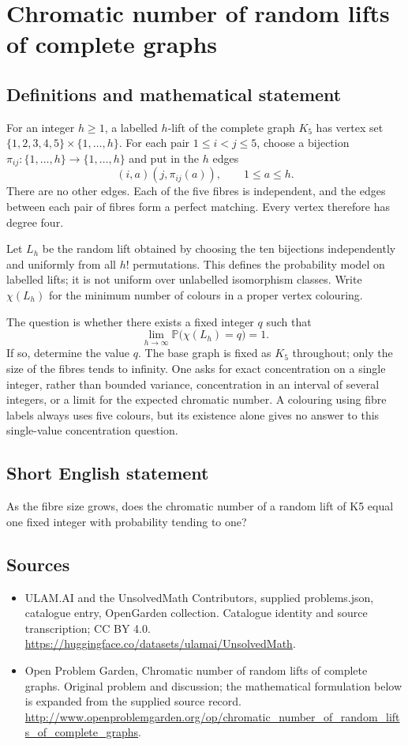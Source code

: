 \documentclass[11pt,a4paper]{article}
\begin{document}
\section*{Chromatic number of random lifts of complete graphs}\label{statement}

\subsection{Definitions and mathematical statement}
For an integer $h\ge1$, a labelled $h$-lift of the complete graph $K_5$
has vertex set $\{1,2,3,4,5\}\times\{1,\ldots,h\}$. For each pair
$1\le i<j\le5$, choose a bijection
$\pi_{ij}:\{1,\ldots,h\}\to\{1,\ldots,h\}$ and put in the $h$ edges
\[
                       (i,a)(j,\pi_{ij}(a)),\qquad 1\le a\le h.
\]
There are no other edges. Each of the five fibres is independent,
and the edges between each pair of fibres form a perfect matching.
Every vertex therefore has degree four.

Let $L_h$ be the random lift obtained by choosing the ten bijections
independently and uniformly from all $h!$ permutations. This defines
the probability model on labelled lifts; it is not uniform over
unlabelled isomorphism classes. Write $\chi(L_h)$ for the minimum
number of colours in a proper vertex colouring.

The question is whether there exists a fixed integer $q$ such that
\[
                     \lim_{h\to\infty}
                     \mathbb P\bigl(\chi(L_h)=q\bigr)=1.
\]
If so, determine the value $q$. The base graph is fixed as $K_5$
throughout; only the size of the fibres tends to infinity. One asks
for exact concentration on a single integer, rather than bounded
variance, concentration in an interval of several integers, or a
limit for the expected chromatic number. A colouring using fibre
labels always uses five colours, but its existence alone gives no
answer to this single-value concentration question.
\subsection{Short English statement}
As the fibre size grows, does the chromatic number of a random lift of K5 equal one fixed integer with probability tending to one?
\subsection{Sources}
\begin{itemize}
\item[S1] ULAM.AI and the UnsolvedMath Contributors, supplied problems.json, catalogue entry, OpenGarden collection. Catalogue identity and source transcription; CC BY 4.0.
\url{https://huggingface.co/datasets/ulamai/UnsolvedMath}.
\item[S2] Open Problem Garden, Chromatic number of random lifts of complete graphs. Original problem and discussion; the mathematical formulation below is expanded from the supplied source record.
\url{http://www.openproblemgarden.org/op/chromatic_number_of_random_lifts_of_complete_graphs}.
\end{itemize}
\end{document}
